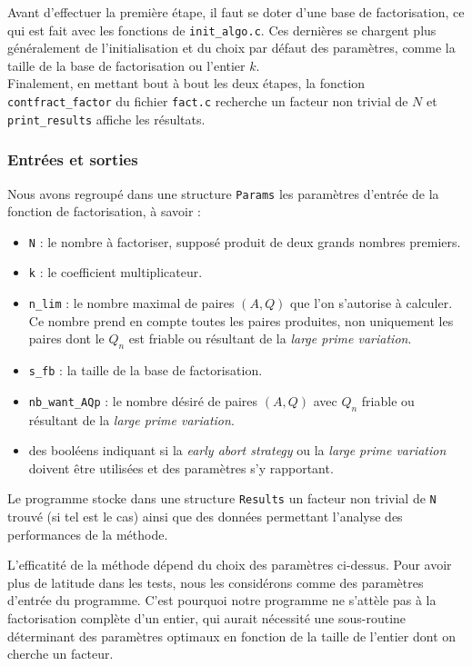 Avant d'effectuer la première étape, il faut se doter d'une base de
factorisation, ce qui est fait avec les fonctions de \texttt{init\_algo.c}.
Ces dernières se chargent plus généralement de l'initialisation et du choix par
défaut des paramètres, comme la taille de la base de factorisation ou l'entier
$k$. \\

Finalement, en mettant bout à bout les deux étapes, la fonction 
\texttt{contfract\_factor} du fichier \texttt{fact.c} recherche un facteur
non trivial de $N$ et \texttt{print\_results} affiche les résultats. 

\subsubsection{Entrées et sorties}

Nous avons regroupé dans une structure \texttt{Params} les paramètres d'entrée
de la fonction de factorisation, à savoir :

\begin{itemize}
	\item \texttt{N} : le nombre à factoriser, supposé produit de deux grands
	nombres premiers.
    \item \texttt{k} : le coefficient multiplicateur.
	\item \texttt{n\_lim} : le nombre maximal de paires $(A,Q)$ que l'on
	s'autorise à calculer. Ce nombre prend en compte toutes les paires
	produites, non uniquement les paires dont le $Q_n$ est friable ou résultant
	de la \textit{large prime variation}.
    \item \texttt{s\_fb} : la taille de la base de factorisation. 
	\item \texttt{nb\_want\_AQp} : le nombre désiré de paires $(A,Q)$ avec
	$Q_n$ friable ou résultant de la \textit{large prime variation}.
	\item des booléens indiquant si la \textit{early abort strategy} ou la
	\textit{large prime variation} doivent être utilisées et des paramètres s'y
	rapportant.
\end{itemize}

Le programme stocke dans une structure \texttt{Results} un facteur non trivial
de \texttt{N} trouvé (si tel est le cas) ainsi que des données permettant 
l'analyse des performances de la méthode.  

\begin{remarque}
	L'efficatité de la méthode dépend du choix des paramètres ci-dessus. Pour
	avoir plus de latitude dans les tests, nous les considérons comme des
	paramètres d'entrée du programme. C'est pourquoi notre programme ne
	s'attèle pas à la factorisation complète d'un entier, qui aurait nécessité
	une sous-routine déterminant des paramètres optimaux en fonction de la
	taille de l'entier dont on cherche un facteur. 
\end{remarque}

